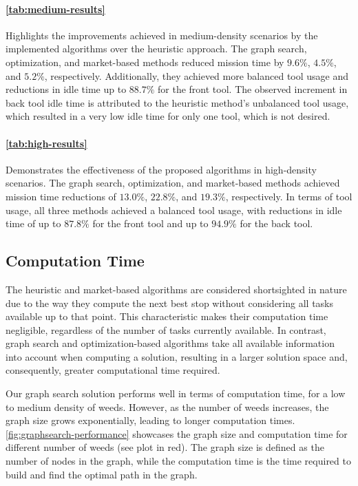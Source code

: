 \paragraph{\autoref{tab:medium-results}} Highlights the improvements achieved in medium-density scenarios by the implemented algorithms over the heuristic approach. The graph search, optimization, and market-based methods reduced mission time by $9.6\%$, $4.5\%$, and $5.2\%$, respectively. Additionally, they achieved more balanced tool usage and reductions in idle time up to $88.7\%$ for the front tool. The observed increment in back tool idle time is attributed to the heuristic method’s unbalanced tool usage, which resulted in a very low idle time for only one tool, which is not desired.

\paragraph{\autoref{tab:high-results}} Demonstrates the effectiveness of the proposed algorithms in high-density scenarios. The graph search, optimization, and market-based methods achieved mission time reductions of $13.0\%$, $22.8\%$, and $19.3\%$, respectively. In terms of tool usage, all three methods achieved a balanced tool usage, with reductions in idle time of up to $87.8\%$ for the front tool and up to $94.9\%$ for the back tool.

\subsection{Computation Time}\label{sec:computation-time}
The heuristic and market-based algorithms are considered shortsighted in nature due to the way they compute the next best stop without considering all tasks available up to that point. This characteristic makes their computation time negligible, regardless of the number of tasks currently available. In contrast, graph search and optimization-based algorithms take all available information into account when computing a solution, resulting in a larger solution space and, consequently, greater computational time required.

Our graph search solution performs well in terms of computation time, for a low to medium density of weeds. However, as the number of weeds increases, the graph size grows exponentially, leading to longer computation times. \autoref{fig:graphsearch-performance} showcases the graph size and computation time for different number of weeds (see plot in red). The graph size is defined as the number of nodes in the graph, while the computation time is the time required to build and find the optimal path in the graph.

